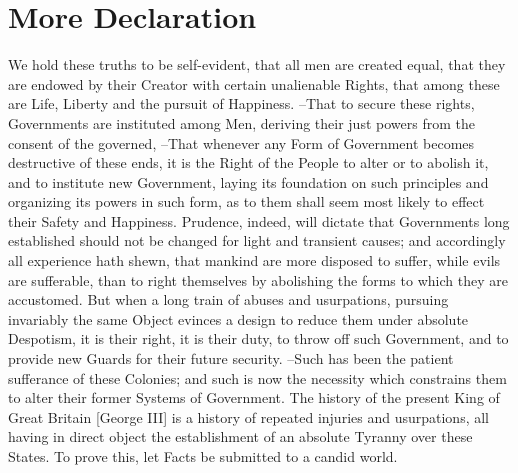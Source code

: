 \section{More Declaration}

We hold these truths to be self-evident, that all men are created equal,  that they are endowed by their Creator with certain unalienable Rights,  that among these are Life, Liberty and the pursuit of Happiness. --That to secure these  rights, Governments are instituted among Men, deriving their just powers  from the consent of the governed, --That whenever any Form of Government  becomes destructive of these ends, it is the Right of the People to alter  or to abolish it, and to institute new Government, laying its foundation on  such principles and organizing its powers in such form, as to them shall  seem most likely to effect their Safety and Happiness. Prudence, indeed, will dictate that Governments long established should not  be changed for light and transient causes; and accordingly all experience  hath shewn, that mankind are more disposed to suffer, while evils are  sufferable, than to right themselves by abolishing the forms to which they  are accustomed. But when a long train of abuses and usurpations, pursuing invariably the same  Object evinces a design to reduce them under absolute Despotism, it is their  right, it is their duty, to throw off such Government, and to provide new Guards for their future security. --Such has been the patient sufferance of these Colonies; and such is now the  necessity which constrains them to alter their former Systems of Government.  The history of the present King of Great Britain [George III] is a history  of repeated injuries and usurpations, all having in direct object the  establishment of an absolute Tyranny over these States. To prove this, let Facts be submitted to a candid world. 